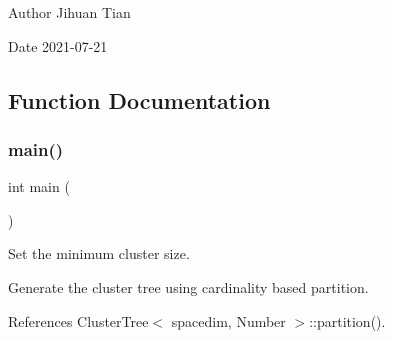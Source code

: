 \begin{DoxyAuthor}{Author}
Jihuan Tian 
\end{DoxyAuthor}
\begin{DoxyDate}{Date}
2021-\/07-\/21 
\end{DoxyDate}


\subsection{Function Documentation}
\mbox{\label{cluster-tree-copy-constructor_8cc_ae66f6b31b5ad750f1fe042a706a4e3d4}} 
\subsubsection{\texorpdfstring{main()}{main()}}
{\footnotesize\ttfamily int main (\begin{DoxyParamCaption}{ }\end{DoxyParamCaption})}

Set the minimum cluster size.

Generate the cluster tree using cardinality based partition.

References Cluster\+Tree$<$ spacedim, Number $>$\+::partition().

